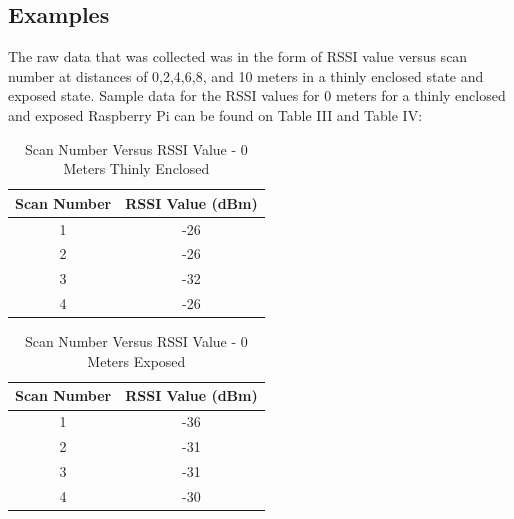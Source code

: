 \documentclass[letterpaper, 10 pt, conference]{ieeeconf}  %
\begin{document}
\subsection{Examples}
The raw data that was collected was in the form of RSSI value versus scan number at distances of 0,2,4,6,8, and 10 meters in a thinly enclosed state and exposed state. Sample data for the RSSI values for 0 meters for a thinly enclosed and exposed Raspberry Pi can be found on Table III and Table IV:
\begin{table}[h]
\caption{Scan Number Versus RSSI Value - 0 Meters Thinly Enclosed}
\label{table_example}
\begin{center}
\begin{tabular}{|c|c|}
\hline
\bf Scan Number & \bf RSSI Value (dBm)\\
\hline
1 & -26\\
\hline
2 & -26\\
\hline
3 & -32\\
\hline
4 & -26\\
\hline
\end{tabular}
\end{center}
\end{table}

\begin{table}[h]
\caption{Scan Number Versus RSSI Value - 0 Meters Exposed}
\label{table_example}
\begin{center}
\begin{tabular}{|c|c|}
\hline
\bf Scan Number & \bf RSSI Value (dBm)\\
\hline
1 & -36\\
\hline
2 & -31\\
\hline
3 & -31\\
\hline
4 & -30\\
\hline
\end{tabular}
\end{center}
\end{table}
\end{document}

